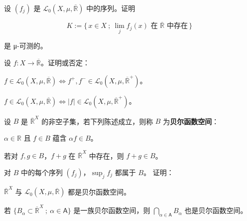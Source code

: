 \begin{exercises}
\item

设 $ (f_j) $ 是 $ \mathcal{L}_0(X,\mu,\overline{\mathbb{R}}) $ 中的序列。证明

\[
K := \{\, x \in X \ ;\ \lim_{j} f_{j}(x) \text{ 在 } \overline{\mathbb{R}} \text{ 中存在} \,\}
\]

是 μ-可测的。

\item

设 $ f: X \to \overline{\mathbb{R}} $。证明或否定：

\begin{items}
\item

$ f \in \mathcal{L}_0(X,\mu,\overline{\mathbb{R}}) \iff f^{+}, f^{-} \in \mathcal{L}_0(X,\mu,\overline{\mathbb{R}}^{+}) $。

\item

$ f \in \mathcal{L}_0(X,\mu,\overline{\mathbb{R}}) \iff |f| \in \mathcal{L}_0(X,\mu,\overline{\mathbb{R}}^{+}) $。

\end{items}

\item

设 $ B $ 是 $ \overline{\mathbb{R}}^{X} $ 的非空子集，若下列陈述成立，则称 $ B $ 为\textbf{贝尔函数空间}：

\begin{subitems}
\item

$ \alpha \in \mathbb{R} $ 且 $ f \in B $ 蕴含 $ \alpha f \in B $。

\item

若对 $ f, g \in B $，$ f+g $ 在 $ \overline{\mathbb{R}}^{X} $ 中存在，则 $ f+g \in B $。

\item

对 $ B $ 中的每个序列 $ (f_j) $，$ \sup_j f_j $ 都属于 $ B $。
证明：

\end{subitems}

\begin{items}
\item

$ \overline{\mathbb{R}}^{X} $ 与 $ \mathcal{L}_0(X,\mu,\overline{\mathbb{R}}) $ 都是贝尔函数空间。

\item

若 $ \{ B_\alpha \subset \overline{\mathbb{R}}^{X} \ ;\ \alpha \in \mathsf{A} \} $ 是一族贝尔函数空间，则 $ \bigcap_{\alpha \in \mathsf{A}} B_\alpha $ 也是贝尔函数空间。


\end{items}
\end{exercises}
